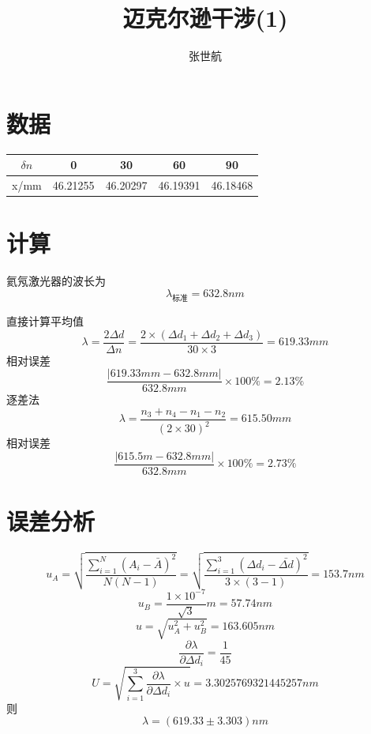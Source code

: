 \documentclass[10pt, a4paper]{article}
\author{张世航}
\title{迈克尔逊干涉(1)}
\begin{document}
	\maketitle
	\section{数据}
	\begin{tabular}{|c|c|c|c|c|}
		\hline
		$\delta n$& 0 & 30 & 60 & 90 \\
		\hline
		x/mm & 46.21255 & 46.20297 & 46.19391 & 46.18468 \\
		\hline
	\end{tabular}
	\section{计算}
	氦氖激光器的波长为\[\lambda_{\text{标准}}=632.8 nm\]
	
	直接计算平均值
	\[\lambda = \frac{2\Delta d}{\Delta n} = \frac{2\times(\Delta d_1+\Delta d_2+\Delta d_3)}{30\times3} = 619.33mm\]
	相对误差 \[\frac{|619.33mm-632.8mm|}{632.8mm} \times 100\%=2.13\% \]
	逐差法
	\[\lambda = \frac{n_3+n_4-n_1-n_2}{(2\times30)^2} = 615.50mm\]
	相对误差 \[\frac{|615.5m-632.8mm|}{632.8mm} \times 100\%=2.73\% \]
	\section{误差分析}
	\[u_A = \sqrt{\frac{\sum_{i=1}^{N}(A_i-\bar{A})^2}{N(N-1)}}=\sqrt{\frac{\sum_{i=1}^{3}(\Delta d_i-\bar{\Delta d})^2}{3\times(3-1)}}=153.7nm\]
	\[u_B = \frac{1\times10^{-7}}{\sqrt{3}}m = 57.74nm\]
	\[u = \sqrt{u_A^2+u_B^2} = 163.605nm\]
	\[\frac{\partial \lambda}{\partial \Delta d_i} = \frac{1}{45}\]
	\[U = \sqrt{\sum_{i=1}^{3}\frac{\partial \lambda}{\partial \Delta d_i}\times u} = 3.3025769321445257nm\]
	则\[\lambda = (619.33\pm3.303)nm\]
\end{document}
